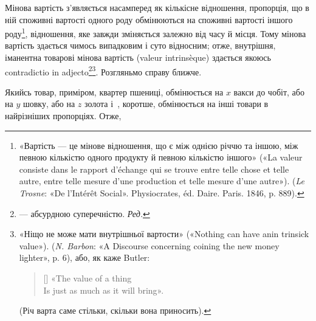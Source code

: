 Мінова вартість з’являється насамперед як кількісне відношення,
пропорція, що в ній споживні вартості одного роду обмінюються
на споживні вартості іншого роду\footnote{
«Вартість — це мінове відношення, що є між однією річчю та іншою,
між певною кількістю одного продукту й певною кількістю іншого»
(«La valeur consiste dans le rapport d’échange qui se trouve entre telle
chose et telle autre, entre telle mesure d’une production et telle mesure
d’une autre»). (\emph{Le Trosne}: «De l’Intérêt Social». Physiocrates, éd. Daire.
Paris. 1846, p. 889).
}, відношення, яке
завжди зміняється залежно від часу й місця. Тому мінова вартість
здається чимось випадковим і суто відносним; отже, внутрішня,
іманентна товарові мінова вартість (valeur intrinsèque) здається
якоюсь contradictio in adjecto\footnote*{
— абсурдною суперечністю. \emph{Ред.}
}\footnote{
«Ніщо не може мати внутрішньої вартости» («Nothing can have
anin trinsick value»). (\emph{N. Barbon}: «A Discourse concerning coining the new
money lighter», p. 6), або, як каже Butler:
\settowidth{\versewidth}{Is just as much as it will bring».}
\begin{verse}[\versewidth]
«The value of a thing \\
Is just as much as it will bring».
\end{verse}
(Річ варта саме стільки, скільки вона приносить).
}. Розгляньмо справу ближче.

Якийсь товар, приміром, квартер пшениці, обмінюється на $x$
вакси до чобіт, або на $y$ шовку, або на $z$ золота і~, коротше,
обмінюється на інші товари в найрізніших пропорціях. Отже,
\parbreak{}  %
